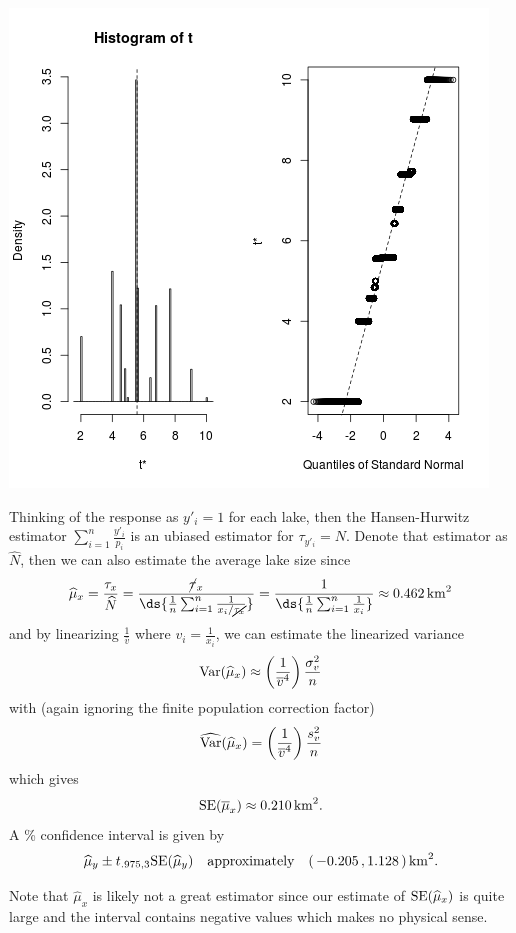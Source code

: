 \documentclass{homework}
\begin{document}
\begin{solution}
\begin{minipage}{.48\textwidth}
\includegraphics[width=\textwidth]{pollution_bootstraps.png}
\end{minipage}

Thinking of the response as $y'_i = 1$ for each lake, then the Hansen-Hurwitz estimator $\sum_{i=1}^n\frac{y'_i}{p_i}$ is an ubiased estimator for $\tau_{y'_i} = N$. Denote that estimator as $\hat N$, then we can also estimate the average lake size since
$$
  \hat\mu_x = \frac{\tau_x}{\hat N} = \frac{\cancel\tau_x}{\ds{\frac 1n\sum_{i=1}^n\frac{1}{x_i/\cancel{\tau_x}}}} = \frac{1}{\ds{\frac 1n\sum_{i=1}^n\frac{1}{x_i}}} \approx \unit[0.462]{\mathrm{km}^2}
$$
and by linearizing $\frac 1{\bar v}$ where $v_i = \frac 1{x_i}$, we can estimate the linearized variance
$$
  \mathrm{Var}(\widehat\mu_x) \approx \left(\frac{1}{\overline v^4}\right) \frac{\sigma^2_v}{n}
$$ with (again ignoring the finite population correction factor)
$$
  \widehat{\mathrm{Var}}(\widehat\mu_x) = \left(\frac{1}{\overline v^4}\right) \frac{s^2_v}{n}
$$
which gives
$$
  \SE(\bar\mu_x) \approx \unit[0.210]{\mathrm{km}^2}.
$$
A \unit[95]{\%} confidence interval is given by
$$
  \widehat\mu_y \pm t_{.975,3} \mathrm{SE}(\widehat \mu_y)\quad\text{approximately} \quad ( \,-0.205\,,  1.128\,)\,\mathrm{km}^2.
$$

Note that $\hat\mu_x$ is likely not a great estimator since our estimate of $\mathrm{SE}(\widehat\mu_x)$ is quite large and the interval contains negative values which makes no physical sense.


\end{solution}
\end{document}
